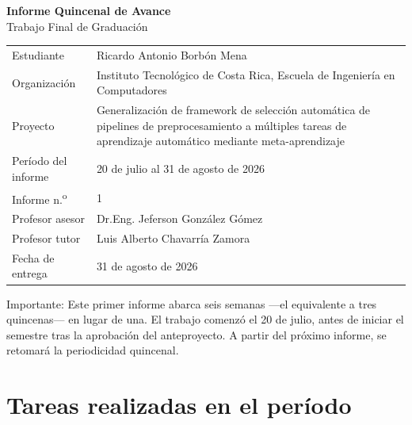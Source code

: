 \documentclass[11pt,letterpaper]{article}
\begin{document}
\vspace*{0.12\textheight}
\begin{center}
{\LARGE\bfseries\color{tecnavy} Informe Quincenal de Avance}\\[4pt]
{\large Trabajo Final de Graduación}\\[10pt]
\end{center}

\vspace{10pt}
\begin{center}
\begin{tabularx}{0.92\textwidth}{L{3.6cm} Y}
\toprule
{}  \\
\midrule
Estudiante & Ricardo Antonio Borbón Mena \\
Organización & Instituto Tecnológico de Costa Rica, Escuela de Ingeniería
en Computadores \\
Proyecto & Generalización de framework de selección automática de pipelines de
preprocesamiento a múltiples tareas de aprendizaje automático mediante
meta-aprendizaje \\
Período del informe & 20 de julio al 31 de agosto de 2026 \\
Informe n.\textsuperscript{o} & 1 \\
Profesor asesor & Dr.Eng. Jeferson González Gómez \\
Profesor tutor & Luis Alberto Chavarría Zamora \\
Fecha de entrega & 31 de agosto de 2026 \\
\bottomrule
\end{tabularx}
\end{center}

\vspace{20pt}
\begin{center}
\begin{minipage}{0.86\textwidth}
\centering
{\small\color{gris} Importante: Este primer informe abarca seis semanas ---el
equivalente a tres quincenas--- en lugar de una. El trabajo comenzó el 20 de julio,
antes de iniciar el semestre tras la aprobación del anteproyecto. A partir del
próximo informe, se retomará la periodicidad quincenal.}
\end{minipage}
\end{center}

\newpage
\section{Tareas realizadas en el período}
\end{document}
